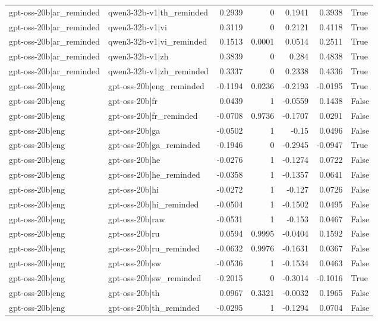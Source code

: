 \begin{table}
\begin{tabular}{l l r r r r l}
gpt-oss-20b|ar_reminded & qwen3-32b-v1|th_reminded & 0.2939 & 0 & 0.1941 & 0.3938 & True \\
gpt-oss-20b|ar_reminded & qwen3-32b-v1|vi & 0.3119 & 0 & 0.2121 & 0.4118 & True \\
gpt-oss-20b|ar_reminded & qwen3-32b-v1|vi_reminded & 0.1513 & 0.0001 & 0.0514 & 0.2511 & True \\
gpt-oss-20b|ar_reminded & qwen3-32b-v1|zh & 0.3839 & 0 & 0.284 & 0.4838 & True \\
gpt-oss-20b|ar_reminded & qwen3-32b-v1|zh_reminded & 0.3337 & 0 & 0.2338 & 0.4336 & True \\
gpt-oss-20b|eng & gpt-oss-20b|eng_reminded & -0.1194 & 0.0236 & -0.2193 & -0.0195 & True \\
gpt-oss-20b|eng & gpt-oss-20b|fr & 0.0439 & 1 & -0.0559 & 0.1438 & False \\
gpt-oss-20b|eng & gpt-oss-20b|fr_reminded & -0.0708 & 0.9736 & -0.1707 & 0.0291 & False \\
gpt-oss-20b|eng & gpt-oss-20b|ga & -0.0502 & 1 & -0.15 & 0.0496 & False \\
gpt-oss-20b|eng & gpt-oss-20b|ga_reminded & -0.1946 & 0 & -0.2945 & -0.0947 & True \\
gpt-oss-20b|eng & gpt-oss-20b|he & -0.0276 & 1 & -0.1274 & 0.0722 & False \\
gpt-oss-20b|eng & gpt-oss-20b|he_reminded & -0.0358 & 1 & -0.1357 & 0.0641 & False \\
gpt-oss-20b|eng & gpt-oss-20b|hi & -0.0272 & 1 & -0.127 & 0.0726 & False \\
gpt-oss-20b|eng & gpt-oss-20b|hi_reminded & -0.0504 & 1 & -0.1502 & 0.0495 & False \\
gpt-oss-20b|eng & gpt-oss-20b|raw & -0.0531 & 1 & -0.153 & 0.0467 & False \\
gpt-oss-20b|eng & gpt-oss-20b|ru & 0.0594 & 0.9995 & -0.0404 & 0.1592 & False \\
gpt-oss-20b|eng & gpt-oss-20b|ru_reminded & -0.0632 & 0.9976 & -0.1631 & 0.0367 & False \\
gpt-oss-20b|eng & gpt-oss-20b|sw & -0.0536 & 1 & -0.1534 & 0.0463 & False \\
gpt-oss-20b|eng & gpt-oss-20b|sw_reminded & -0.2015 & 0 & -0.3014 & -0.1016 & True \\
gpt-oss-20b|eng & gpt-oss-20b|th & 0.0967 & 0.3321 & -0.0032 & 0.1965 & False \\
gpt-oss-20b|eng & gpt-oss-20b|th_reminded & -0.0295 & 1 & -0.1294 & 0.0704 & False \\

\end{tabular}
\end{table}

